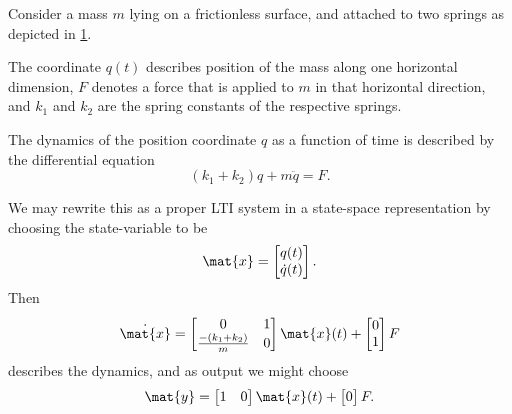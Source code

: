 \begin{example}
    \label{exa:sping-mass-lti}
    Consider a mass $m$ lying on a frictionless surface, and attached to two springs as depicted in \cref{fig:LTI-example_two-springs-one-mass}.

    \begin{figure}[h]\label{fig:LTI-example_two-springs-one-mass}
        \centering
    \end{figure}

    The coordinate $q(t)$ describes position of the mass along one horizontal dimension, $F$ denotes a force that is applied to $m$ in that horizontal direction, and $k_1$ and $k_2$ are the spring constants of the respective springs.

    The dynamics of the position coordinate $q$ as a function of time is described by the differential equation
    \begin{equation}\label{eq:LTI-exa-double-spring-equation}
        (k_1 + k_2)q + m \ddot q = F.
    \end{equation}

    We may rewrite this as a proper LTI system in a state-space representation by choosing the state-variable to be
    \begin{equation}\label{eq:LTI-exa-double-spring-state}
        \mat{x} =
        \begin{bmatrix}
            q(t) \\
            \dot{q}(t)
        \end{bmatrix}.
    \end{equation}
    Then
    \begin{equation}\label{eq:LTI-exa-double-spring-dynamics}
        \dot{\mat{x}} =
        \begin{bmatrix}
            0                       & 1 \\
            \tfrac{-(k_1 + k_2)}{m} & 0
        \end{bmatrix}
        \mat{x}(t) +
        \begin{bmatrix}
            0 \\
            1
        \end{bmatrix}
        F
    \end{equation}
    describes the dynamics, and as output we might choose
    \begin{equation}\label{eq:LTI-exa-double-spring-readout}
        \mat{y} =
        \begin{bmatrix}
            1 & 0
        \end{bmatrix}
        \mat{x}(t) +
        \begin{bmatrix}
            0
        \end{bmatrix}
        F.
    \end{equation}
\end{example}

